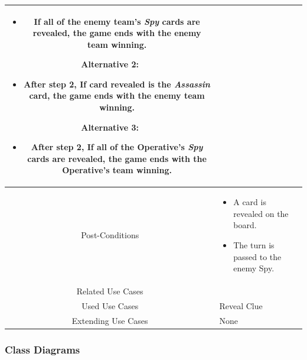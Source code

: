 \documentclass[10pt, a4paper]{article}
\begin{document}
\begin{center}
\begin{tabular}{ |c|p{10cm}| }
\begin{itemize}[noitemsep,topsep=0pt]
					\item If all of the enemy team's \textit{Spy} cards are revealed, the game ends with the enemy team winning.
				\end{itemize}
			Alternative 2:
				\begin{itemize}[noitemsep,topsep=0pt]
					\item After step 2, If card revealed is the \textit{Assassin} card, the game ends with the enemy team winning.
				\end{itemize}
			Alternative 3:
				\begin{itemize}[noitemsep,topsep=0pt]
					\item After step 2, If all of the Operative's \textit{Spy} cards are revealed, the game ends with the Operative's team winning.
				\end{itemize}\\
			\hline 
			Post-Conditions & 
			\begin{itemize}[noitemsep,topsep=0pt]
				\item A card is revealed on the board.
				\item The turn is passed to the enemy Spy.
			\end{itemize} \\
			\hline 
			Related Use Cases & \\
			\hline 
			Used Use Cases & Reveal Clue \\
			\hline
			Extending Use Cases & None \\
			\hline
		\end{tabular}
	\end{center}
	
	\newpage
	
		\subsubsection{Class Diagrams}
		
\end{document}
